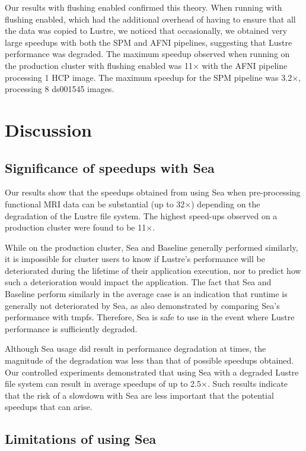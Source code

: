 \documentclass[fleqn,10pt]{wlscirep}
\begin{document}
  Our results with flushing enabled confirmed this theory. When running with
  flushing enabled, which had the additional overhead of having to
  ensure that all the data was copied to Lustre, we noticed that occasionally, we
  obtained very large speedups with both the SPM and AFNI pipelines, suggesting that Lustre
  performance was degraded. The
  maximum speedup observed when running on the production cluster with flushing enabled was
  11$\times$ with the AFNI pipeline processing 1 HCP image. The maximum speedup for the SPM pipeline was
  3.2$\times$, processing 8 ds001545 images.

    
    \section{Discussion}
    \subsection{Significance of speedups with Sea}

    Our results show that the speedups obtained from using Sea when pre-processing functional MRI data can be 
    substantial (up to 32$\times$) depending on the degradation of the Lustre
    file system. The highest speed-ups observed on a production cluster were
    found to be 11$\times$.

    While on the production cluster, Sea and Baseline generally performed similarly,
    it is impossible for cluster users to know if Lustre's
    performance will be deteriorated during the lifetime of their application
    execution, nor to predict how such a deterioration would impact the
    application. The fact that Sea and Baseline perform similarly in the average
    case is an indication that runtime is generally not deteriorated by Sea, as
    also demonstrated by comparing Sea's performance with tmpfs. Therefore, Sea
    is safe to use in the event where Lustre performance is sufficiently
    degraded.

    Although Sea usage did result in performance degradation at times, the magnitude
    of the degradation was less than that of possible speedups
    obtained. Our controlled experiments demonstrated that using Sea with a
    degraded Lustre file system can result in average speedups of up to
    2.5$\times$. Such results indicate that the risk of a slowdown with Sea are
    less important that the potential speedups that can arise.

    \subsection{Limitations of using Sea}
    
\end{document}
